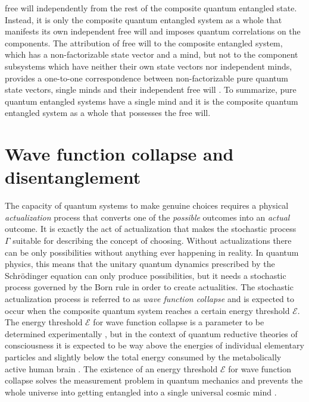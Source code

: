 \documentclass{ws-ijmpb}
\begin{document}
\begin{example}
free will independently from the rest of the composite quantum entangled
state. Instead, it is only the composite quantum entangled system
as a whole that manifests its own independent free will and imposes
quantum correlations on the components. The attribution of free will
to the composite entangled system, which has a non-factorizable state
vector and a mind, but not to the component subsystems which have
neither their own state vectors nor independent minds, provides a
one-to-one correspondence between non-factorizable pure quantum state
vectors, single minds and their independent free will \cite{Georgiev2017}. To summarize,
pure quantum entangled systems have a single mind and it is the composite
quantum entangled system as a whole that possesses the free will.
\end{example}

\section{Wave function collapse and disentanglement}
\label{S8}

The capacity of quantum systems to make genuine choices requires a
physical \emph{actualization} process that converts one of the \emph{possible}
outcomes into an \emph{actual} outcome. It is exactly the act of actualization
that makes the stochastic process~$\Gamma$ suitable for describing
the concept of choosing. Without actualizations there can be only
possibilities without anything ever happening in reality. In quantum
physics, this means that the unitary quantum dynamics prescribed by
the Schr\"{o}dinger equation can only produce possibilities, but it needs
a stochastic process governed by the Born rule in order to create
actualities. The stochastic actualization process is referred to as
\emph{wave function collapse} and is expected to occur when the composite
quantum system reaches a certain energy threshold $\mathscr{E}$.
The energy threshold $\mathscr{E}$ for wave function collapse is
a parameter to be determined experimentally \cite{Bassi2003,Vinante2020,Carlesso2022}, but in the context of
quantum reductive theories of consciousness it is expected to be way
above the energies of individual elementary particles and slightly
below the total energy consumed by the metabolically active human
brain \cite{Georgiev2017}. The existence of an energy threshold $\mathscr{E}$
for wave function collapse solves the measurement problem in quantum
mechanics and prevents the whole universe into getting entangled into
a single universal cosmic mind \cite{Georgiev2017,Georgiev2020b}.
\end{document}

